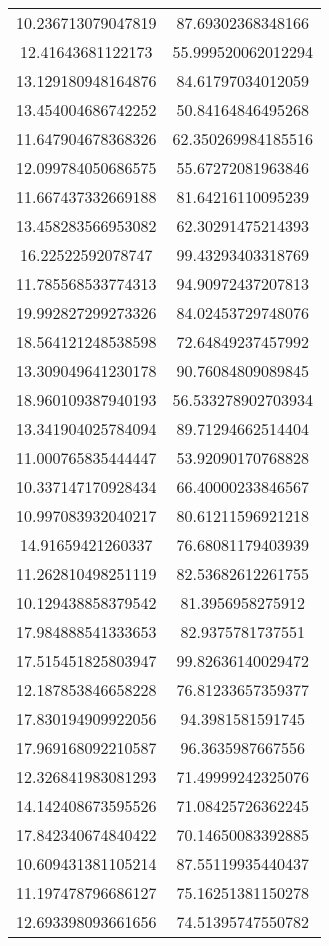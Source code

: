 \begin{table}
\begin{tabular}{cc}
10.236713079047819 & 87.69302368348166 \\
12.41643681122173 & 55.999520062012294 \\
13.129180948164876 & 84.61797034012059 \\
13.454004686742252 & 50.84164846495268 \\
11.647904678368326 & 62.350269984185516 \\
12.099784050686575 & 55.67272081963846 \\
11.667437332669188 & 81.64216110095239 \\
13.458283566953082 & 62.30291475214393 \\
16.22522592078747 & 99.43293403318769 \\
11.785568533774313 & 94.90972437207813 \\
19.992827299273326 & 84.02453729748076 \\
18.564121248538598 & 72.64849237457992 \\
13.309049641230178 & 90.76084809089845 \\
18.960109387940193 & 56.533278902703934 \\
13.341904025784094 & 89.71294662514404 \\
11.000765835444447 & 53.92090170768828 \\
10.337147170928434 & 66.40000233846567 \\
10.997083932040217 & 80.61211596921218 \\
14.91659421260337 & 76.68081179403939 \\
11.262810498251119 & 82.53682612261755 \\
10.129438858379542 & 81.3956958275912 \\
17.984888541333653 & 82.9375781737551 \\
17.515451825803947 & 99.82636140029472 \\
12.187853846658228 & 76.81233657359377 \\
17.830194909922056 & 94.3981581591745 \\
17.969168092210587 & 96.3635987667556 \\
12.326841983081293 & 71.49999242325076 \\
14.142408673595526 & 71.08425726362245 \\
17.842340674840422 & 70.14650083392885 \\
10.609431381105214 & 87.55119935440437 \\
11.197478796686127 & 75.16251381150278 \\
12.693398093661656 & 74.51395747550782 \\

\end{tabular}
\end{table}
